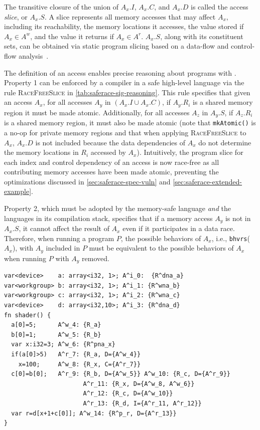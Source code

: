 The transitive closure of the union of $A_x.I$, $A_x.C$, and $A_x.D$ is called the access \textit{slice}, or $A_x.S$. A slice represents all memory accesses that may affect $A_x$, including its reachability, the memory locations it accesses, the value stored if $A_x \in A^w$, and the value it returns if $A_x \in A^r$. $A_x.S$, along with its constituent sets, can be obtained via static program slicing based on a data-flow and control-flow analysis~\cite{weiser1984slicing}.

The definition of an access enables precise reasoning about programs with \smsg. Property 1 can be enforced by a compiler in a safe high-level language via the rule \textsc{RaceFreeSlice} in \mytab\ref{tab:saferace-sig-reasoning}. This rule specifies that given an access $A_x$, for all accesses $A_y$ in $(A_x.I \cup A_x.C)$, if $A_y.R_i$ is a shared memory region it must be made atomic. Additionally, for all accesses $A_z$ in $A_y.S$, if $A_z.R_i$ is a shared memory region, it must also be made atomic (note that \texttt{mkAtomic()} is a no-op for private memory regions and that when applying \textsc{RaceFreeSlice} to $A_x$, $A_x.D$ is not included because the data dependencies of $A_x$ do not determine the memory locations in $R_i$ accessed by $A_x$). Intuitively, the program slice for each index and control dependency of an access is now race-free as all contributing memory accesses have been made atomic, preventing the optimizations discussed in \mysec\ref{sec:saferace-spec-vuln} and \mysec\ref{sec:saferace-extended-example}.

Property 2, which must be adopted by the memory-safe language \textit{and} the languages in its compilation stack, specifies that if a memory access $A_y$ is not in $A_x.S$, it cannot affect the result of $A_x$ even if it participates in a data race. Therefore, when running a program $P$, the possible behaviors of $A_x$, i.e., \texttt{bhvrs}($A_x$), with $A_y$ included in $P$ must be equivalent to the possible behaviors of $A_x$ when running $P$ with $A_y$ removed.

\begin{lstlisting}[float=t, language=wgsl, mathescape=false, caption={WGSL pseudocode illustrating how to apply the \saferace memory logic.}, label={list:saferace-smsg-reasoning}, basicstyle=\small, xleftmargin=10pt, xrightmargin=10pt]
var<device>    a: array<i32, 1>; A^i_0:  {R^dna_a}
var<workgroup> b: array<i32, 1>; A^i_1: {R^wna_b}
var<workgroup> c: array<i32, 1>; A^i_2: {R^wna_c}
var<device>    d: array<i32,10>; A^i_3: {R^dna_d}
fn shader() {
  a[0]=5;      A^w_4: {R_a}
  b[0]=1;      A^w_5: {R_b}
  var x:i32=3; A^w_6: {R^pna_x}
  if(a[0]>5)   A^r_7: {R_a, D={A^w_4}}
    x=100;     A^w_8: {R_x, C={A^r_7}}
  c[0]=b[0];   A^r_9: {R_b, D={A^w_5}} A^w_10: {R_c, D={A^r_9}}
                      A^r_11: {R_x, D={A^w_8, A^w_6}}
                      A^r_12: {R_c, D={A^w_10}}
                      A^r_13: {R_d, I={A^r_11, A^r_12}}
  var r=d[x+1+c[0]]; A^w_14: {R^p_r, D={A^r_13}}
}
\end{lstlisting}

